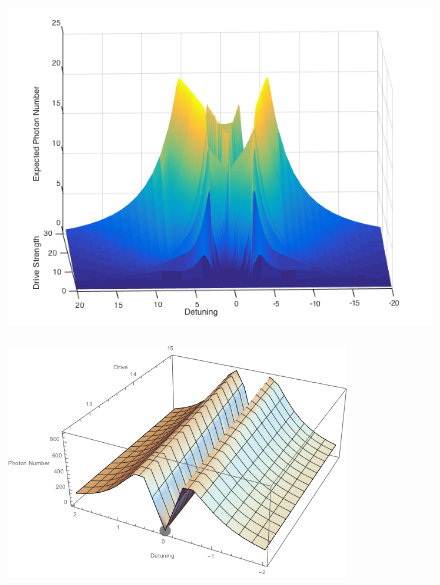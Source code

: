 \begin{figure}[h]
	\begin{minipage}{.3\linewidth}
		\centering
		\includegraphics[width=1\textwidth]{Images/HighResCarmichaelPlot.png}
		\label{fig:densp}
	\end{minipage}%
	\begin{minipage}{.3\linewidth}
		\centering
		\includegraphics[width=0.8\textwidth]{Images/MeanFieldPhotonNumber.png}
		\label{fig:meanfieldp}
	\end{minipage}%
	\begin{minipage}{.3\linewidth}
		\centering

\end{minipage}
\end{figure}
